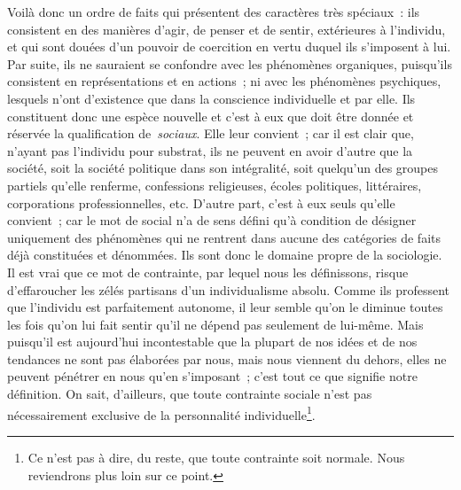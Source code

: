 \documentclass[french,twoside]{book} %
\begin{document}
Voilà donc un ordre de faits qui présentent des caractères très spéciaux : ils consistent en des manières d’agir, de penser et de sentir, extérieures à l’individu, et qui sont douées d’un pouvoir de coercition en vertu duquel ils s’imposent à lui. Par suite, ils ne sauraient se confondre avec les phénomènes organiques, puisqu’ils consistent en représentations et en actions ; ni avec les phénomènes psychiques, lesquels n’ont d’existence que dans la conscience individuelle et par elle. Ils constituent donc une espèce nouvelle et c’est à eux que doit être donnée et réservée la qualification de {\itshape sociaux}. Elle leur convient ; car il est clair que, n’ayant pas l’individu pour substrat, ils ne peuvent en avoir d’autre que la société, soit la société politique dans son intégralité, soit quelqu’un des groupes partiels qu’elle renferme, confessions religieuses, écoles politiques, littéraires, corporations professionnelles, etc. D’autre part, c’est à eux seuls qu’elle convient ; car le mot de social n’a de sens défini qu’à condition de désigner uniquement des phénomènes qui ne rentrent dans aucune des catégories de faits déjà constituées et dénommées. Ils sont donc le domaine propre de la sociologie. Il est vrai que ce mot de contrainte, par lequel nous les définissons, risque d’effaroucher les zélés partisans d’un individualisme absolu. Comme ils professent que l’individu est parfaitement autonome, il leur semble qu’on le diminue toutes les fois qu’on lui fait sentir qu’il ne dépend pas seulement de lui-même. Mais puisqu’il est aujourd’hui incontestable que la plupart de nos idées et de nos tendances ne sont pas élaborées par nous, mais nous viennent du dehors, elles ne peuvent pénétrer en nous qu’en s’imposant ; c’est tout ce que signifie notre définition. On sait, d’ailleurs, que toute contrainte sociale n’est pas nécessairement exclusive de la personnalité individuelle\footnote{ Ce n’est pas à dire, du reste, que toute contrainte soit normale. Nous reviendrons plus loin sur ce point.}.\par
\end{document}

